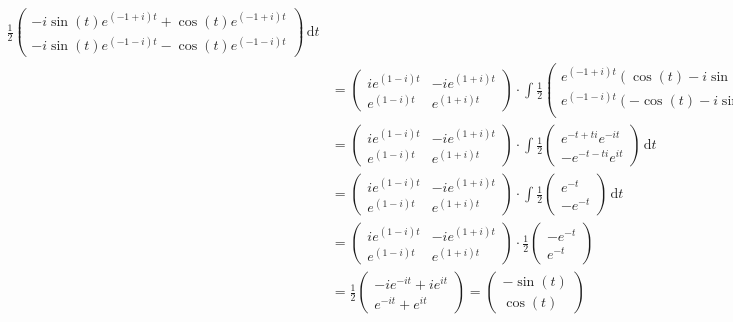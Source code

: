 \documentclass[fleqn,12pt]{scrartcl}
\newcommand{\id}{\, \mathrm{d}}
\begin{document}
\begin{itemize}
\begin{align*}
\frac12 \begin{pmatrix}
-i \sin(t)e^{(-1+i)t} +  \cos(t)e^{(-1+i)t}\\
	-i \sin(t)e^{(-1-i)t} - \cos(t)e^{(-1-i)t}
\end{pmatrix} \id t \\
	&=
	\begin{pmatrix} 
		ie^{(1-i)t} & -ie^{(1+i)t}\\
e^{(1-i)t} & e^{(1+i)t}
\end{pmatrix} \cdot \int
\frac12 \begin{pmatrix}
	e^{(-1+i)t}(\cos(t) -i \sin(t))\\
	e^{(-1-i)t}(-\cos(t) -i\sin(t))\\
\end{pmatrix} \id t \\
	&=
	\begin{pmatrix} 
		ie^{(1-i)t} & -ie^{(1+i)t}\\
e^{(1-i)t} & e^{(1+i)t}
\end{pmatrix} \cdot \int
\frac12 \begin{pmatrix}
	e^{-t+ti}e^{-it}\\
	-e^{-t-ti}e^{it}
\end{pmatrix} \id t \\
	&=
	\begin{pmatrix} 
		ie^{(1-i)t} & -ie^{(1+i)t}\\
e^{(1-i)t} & e^{(1+i)t}
\end{pmatrix} \cdot \int
\frac12 \begin{pmatrix}
	e^{-t}\\
	-e^{-t}
\end{pmatrix} \id t \\
	&=
	\begin{pmatrix} 
		ie^{(1-i)t} & -ie^{(1+i)t}\\
e^{(1-i)t} & e^{(1+i)t}
\end{pmatrix} \cdot
\frac12 \begin{pmatrix}
	-e^{-t}\\
	e^{-t}
\end{pmatrix} \\
&=\frac12\begin{pmatrix}
-ie^{-it} + ie^{it}\\
e^{-it} + e^{it}
\end{pmatrix} = \begin{pmatrix} -\sin(t) \\ \cos(t) \end{pmatrix} \\
\end{align*}



\end{itemize}
\end{document}
